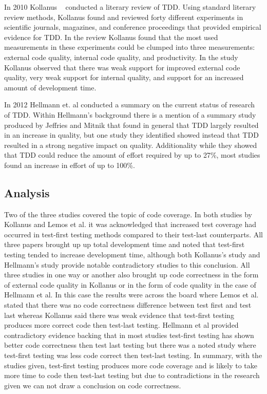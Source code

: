 \documentclass{sig-alternate}
\begin{document}
In 2010 Kollanus ~\cite{Kollanus:2010} conducted a literary review of TDD.  Using standard literary review methods, Kollanus found and reviewed forty different experiments in scientific journals, magazines, and conference proceedings that provided empirical evidence for TDD.  In the review Kollanus found that the most used measurements in these experiments could be clumped into three measurements: external code quality, internal code quality, and productivity.  In the study Kollanus observed that there was weak support for improved external code quality, very weak support for internal quality, and support for an increased amount of development time.

In 2012 Hellmann et. al conducted a summary on the current status of research of TDD.  Within Hellmann’s background there is a mention of a summary study produced by Jeffries and Mitnik that found in general that TDD largely resulted in an increase in quality, but one study they identified showed instead that TDD resulted in a strong negative impact on quality.  Additionality while they showed that TDD could reduce the amount of effort required by up to 27\%, most studies found an increase in effort of up to 100\%.

\subsection{Analysis}
Two of the three studies covered the topic of code coverage.  In both studies by Kollanus and Lemos et al. it was acknowledged that increased test coverage had occurred in test-first testing methods compared to their test-last counterparts.  All three papers brought up up total development time and noted that test-first testing tended to increase development time, although both Kollanus’s study and Hellmann’s study provide notable contradictory studies to this conclusion.   All three studies in one way or another also brought up code correctness in the form of external code quality in Kollanus or in the form of code quality in the case of Hellmann et al.  In this case the results were across the board where Lemos et al. stated that there was no code correctness difference between test first and test last whereas Kollanus said there was weak evidence that test-first testing produces more correct code then test-last testing.  Hellmann et al provided contradictory evidence backing that in most studies test-first testing has shown better code correctness then test last testing but there was a noted study where test-first testing was less code correct then test-last testing.   In summary, with the studies given, test-first testing produces more code coverage and is likely to take more time to code then test-last testing but due to contradictions in the research given we can not draw a conclusion on code correctness.
\end{document}

